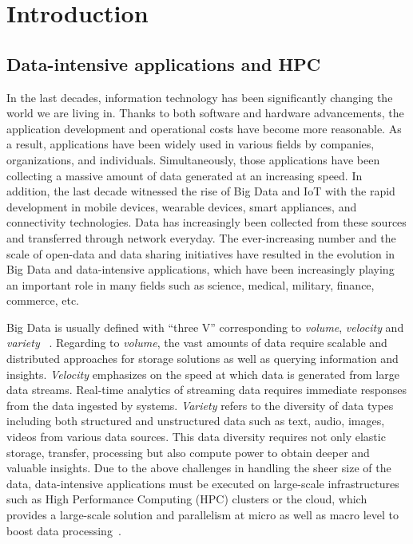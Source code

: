 \chapter{Introduction}
\label{introduction}

\section{Data-intensive applications and HPC}

In the last decades, information technology has been significantly changing the 
world we are living in. 
Thanks to both software and hardware advancements, the application development 
and operational costs have become more reasonable. 
As a result, applications have been widely used in various fields by companies, 
organizations, and individuals. Simultaneously, those applications have been 
collecting a massive amount of data generated at an increasing speed.
In addition, the last decade witnessed the rise of Big Data and IoT with the rapid 
development in mobile devices, wearable devices, smart appliances, 
and connectivity technologies. Data has increasingly been collected from 
these sources and transferred through network everyday. 
The ever-increasing number and the scale of open-data and data sharing initiatives 
have resulted in the evolution in Big Data and data-intensive applications, 
which have been increasingly playing an important role in many fields such as 
science, medical, military, finance, commerce, etc.

Big Data is usually defined with ``three V'' corresponding to \textit{volume}, 
\textit{velocity} and \textit{variety} ~\cite{de2016formal}.  
Regarding to \textit{volume}, the vast amounts of data require scalable and distributed 
approaches for storage solutions as well as querying information and insights.  
\textit{Velocity} emphasizes on the speed at which data is generated from large data 
streams. Real-time analytics of streaming data requires immediate responses 
from the data ingested by systems.
\textit{Variety} refers to the diversity of data types including both structured and 
unstructured data such as text, audio, images, videos from various data sources.
This data diversity requires not only elastic storage, transfer, processing but also 
compute power to obtain deeper and valuable insights.  
Due to the above challenges in handling the sheer size of the data, data-intensive 
applications must be executed on large-scale infrastructures such as High Performance 
Computing (HPC) clusters or the cloud, which provides a large-scale solution 
and parallelism at micro as well as macro level to boost data 
processing~\cite{philipchen2014}.

